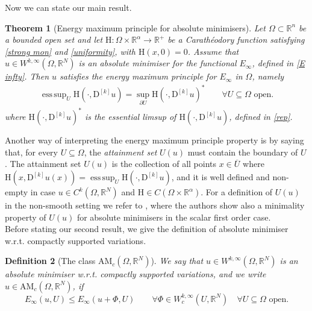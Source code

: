 \documentclass[a4paper,11pt]{article}
\numberwithin{equation}{section}
\newtheorem{Theorem}{Theorem}[section]
\newtheorem{Definition}[Theorem]{Definition}
\newcommand{\numberset}{\mathbb}
\newcommand{\Om}{\Omega}
\newcommand{\R}{\numberset{R}}
\newcommand{\rom}{\mathrm}
\DeclareMathOperator*{\esssup}{ess\,sup}
\theoremstyle{definition}
\begin{document}
Now we can state our main result.
\begin{Theorem}[Energy maximum principle for absolute minimisers]\label{thm1}
Let $\Om\subset\R^n$ be a bounded open set and let $\rom{H}:\Om\times\R^\alpha\to\R^+$ be a Carathéodory function satisfying \eqref{strong mon} and \eqref{uniformity}, with $\rom{H}(x,0)=0$. Assume that $u\in W^{k,\infty}(\Om,\R^N)$ is an absolute minimiser for the functional $E_\infty$, defined in \eqref{E infty}. Then $u$ satisfies the energy maximum principle for $E_\infty$ in $\Om$, namely
\begin{align}\label{MP}
\esssup_U \rom{H}(\cdot, \mathrm D ^{[k]}u)=\sup_{\partial U}\rom{H}(\cdot,\mathrm D ^{[k]}u)^*\qquad\forall U\subseteq\Om \mbox{ open}.
\end{align}
where $\rom{H}(\cdot,\mathrm D ^{[k]}u)^*$ is the essential limsup of $\rom{H}(\cdot,\mathrm D ^{[k]}u)$, defined in \eqref{rep}.
\end{Theorem}
Another way of interpreting the energy maximum principle property is by saying that, for every $U\subseteq\Om$, the \textit{attainment set} $U(u)$ must contain the boundary of $U$. The attainment set $U(u)$ is the collection of all points $x\in \overline U$ where $\rom{H}(x, \mathrm D ^{[k]}u(x))=\esssup_U \rom{H}(\cdot, \mathrm D ^{[k]}u)$, and it is well defined and non-empty in case $u\in C^k(\Om,\R^N)$ and $\rom{H}\in C(\Om\times\R^\alpha)$. For a definition of $U(u)$ in the non-smooth setting we refer to \cite{BDP}, where the authors show also a minimality property of $U(u)$ for absolute minimisers in the scalar first order case.\\

Before stating our second result, we give the definition of absolute minimiser w.r.t. compactly supported variations. 
\begin{Definition}[The class $\mathrm {AM}_c(\Om,\R^N)$]
We say that $u\in W^{k,\infty}(\Om,\R^N)$ is an absolute minimiser w.r.t. compactly supported variations, and we write $u\in \mathrm {AM}_c(\Om,\R^N)$, if
$$
E_\infty(u,U)\leq E_\infty (u+\Phi,U)\qquad\forall \Phi\in W^{k,\infty}_c(U,\R^N)\quad\forall U\subseteq\Om\mbox{ open}.
$$
\end{Definition}
\end{document}
